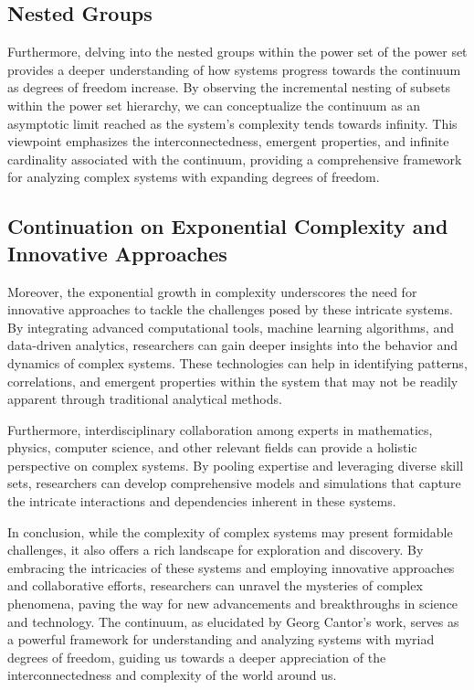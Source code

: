 \documentclass{article}
\begin{document}
\subsection{Nested Groups}
Furthermore, delving into the nested groups within the power set of the power set provides a deeper understanding of how systems progress towards the continuum as degrees of freedom increase. By observing the incremental nesting of subsets within the power set hierarchy, we can conceptualize the continuum as an asymptotic limit reached as the system's complexity tends towards infinity. This viewpoint emphasizes the interconnectedness, emergent properties, and infinite cardinality associated with the continuum, providing a comprehensive framework for analyzing complex systems with expanding degrees of freedom.

\subsection{Continuation on Exponential Complexity and Innovative Approaches}

Moreover, the exponential growth in complexity underscores the need for innovative approaches to tackle the challenges posed by these intricate systems. By integrating advanced computational tools, machine learning algorithms, and data-driven analytics, researchers can gain deeper insights into the behavior and dynamics of complex systems. These technologies can help in identifying patterns, correlations, and emergent properties within the system that may not be readily apparent through traditional analytical methods.

Furthermore, interdisciplinary collaboration among experts in mathematics, physics, computer science, and other relevant fields can provide a holistic perspective on complex systems. By pooling expertise and leveraging diverse skill sets, researchers can develop comprehensive models and simulations that capture the intricate interactions and dependencies inherent in these systems.

In conclusion, while the complexity of complex systems may present formidable challenges, it also offers a rich landscape for exploration and discovery. By embracing the intricacies of these systems and employing innovative approaches and collaborative efforts, researchers can unravel the mysteries of complex phenomena, paving the way for new advancements and breakthroughs in science and technology. The continuum, as elucidated by Georg Cantor's work, serves as a powerful framework for understanding and analyzing systems with myriad degrees of freedom, guiding us towards a deeper appreciation of the interconnectedness and complexity of the world around us.
\end{document}
